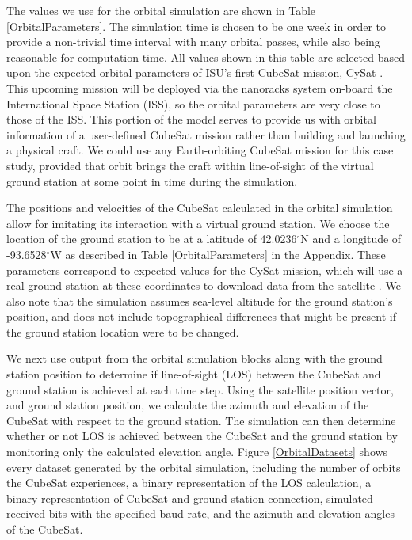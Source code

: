 \documentclass[conf]{new-aiaa}
\begin{document}
The values we use for the orbital simulation are shown in Table \ref{OrbitalParameters}. %
The simulation time is chosen to be one week in order to provide a non-trivial %
time interval with many orbital passes, while also being reasonable for computation time. All values shown in this table are selected based upon the expected orbital parameters of ISU's first CubeSat mission, CySat \cite{Nelson2020}. This upcoming mission will be deployed via the nanoracks system on-board the International Space Station (ISS), so the orbital parameters are very close to those of the ISS. This portion of the model serves to provide us with orbital information of a user-defined CubeSat mission rather than building and launching a physical craft. We could use any Earth-orbiting CubeSat mission for this case study, provided that orbit brings the craft within line-of-sight of the virtual ground station at some point in time during the simulation. 

The positions and velocities of the CubeSat calculated in the orbital simulation allow for imitating its interaction with a virtual ground station. We choose the location of the ground station to be at a latitude of 42.0236$^{\circ}$N and a longitude of -93.6528$^{\circ}$W as described in Table \ref{OrbitalParameters} in the Appendix. These parameters correspond to expected values for the CySat mission, which will use a real ground station at these coordinates to download data from the satellite \cite{Nelson2020}. We also note that the simulation assumes sea-level altitude for the ground station's position, and does not include topographical differences that might be present if the ground station location were to be changed.

We next use output from the orbital simulation blocks along with the ground station position to determine if line-of-sight (LOS) between the CubeSat and ground station is achieved at each time step. Using the satellite position vector, and ground station position, we calculate the azimuth and elevation of the CubeSat with respect to the ground station. The simulation can then determine whether or not LOS is achieved between the CubeSat and the ground station by monitoring only the calculated elevation angle. Figure \ref{OrbitalDatasets} shows every dataset generated by the orbital simulation, including the number of orbits the CubeSat experiences, a binary representation of the LOS calculation, a binary representation of CubeSat and ground station connection, simulated received bits with the specified baud rate, and the azimuth and elevation angles of the CubeSat.
\end{document}

